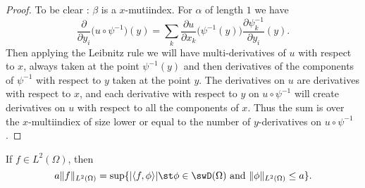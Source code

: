 \begin{proof}
    To be clear : \( \beta\) is a \( x\)-mutiindex. For \( \alpha\) of length \( 1\) we have
    \begin{equation}
        \frac{ \partial  }{ \partial y_i }\big( u\circ\psi^{-1} \big)(y)=\sum_k\frac{ \partial u }{ \partial x_k }\big( \psi^{-1}(y) \big)\frac{ \partial \psi_k^{-1} }{ \partial y_i }(y).
    \end{equation}
    Then applying the Leibnitz rule we will have multi-derivatives of \( u\) with respect to \( x\), always taken at the point \( \psi^{-1}(y)\) and then derivatives of the components of \( \psi^{-1}\) with respect to \( y\) taken at the point \( y\). The derivatives on \( u\) are derivatives with respect to \( x\), and each derivative with respect to \( y\) on \( u\circ\psi^{-1}\) will create derivatives on $u$ with respect to all the components of \( x\). Thus the sum is over the \( x\)-multiindiex of size lower or equal to the number of \( y\)-derivatives on \( u\circ\psi^{-1}\).
\end{proof}

\begin{lemma}       \label{LEMooFKYAooQqmdEQ}
    If \( f\in L^2(\Omega)\), then
    \begin{equation}
        a\| f \|_{L^2(\Omega)}=\sup\{ | \langle f, \phi\rangle  |\st \phi\in\swD(\Omega)\text{ and }\| \phi \|_{L^2(\Omega)}\leq a \}.
    \end{equation}
\end{lemma}

